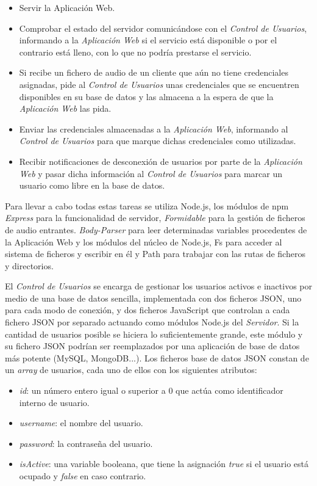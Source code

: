 \begin{itemize}
\item Servir la Aplicación Web.
\item Comprobar el estado del servidor comunicándose con el \emph{Control de Usuarios}, informando a la \emph{Aplicación Web} si el servicio está disponible o por el contrario está lleno, con lo que no podría prestarse el servicio.
\item Si recibe un fichero de audio de un cliente que aún no tiene credenciales asignadas, pide al \emph{Control de Usuarios} unas credenciales que se encuentren disponibles en su base de datos y las almacena a la espera de que la \emph{Aplicación Web} las pida.
\item Enviar las credenciales almacenadas a la \emph{Aplicación Web}, informando al \emph{Control de Usuarios} para que marque dichas credenciales como utilizadas.
\item Recibir notificaciones de desconexión de usuarios por parte de la \emph{Aplicación Web} y pasar dicha información al \emph{Control de Usuarios} para marcar un usuario como libre en la base de datos.
\end{itemize}

Para llevar a cabo todas estas tareas se utiliza Node.js, los módulos de npm \emph{Express} para la funcionalidad de servidor, \emph{Formidable} para la gestión de ficheros de audio entrantes. \emph{Body-Parser} para leer determinadas variables procedentes de la Aplicación Web y los módulos del núcleo de Node.js, Fs para acceder al sistema de ficheros y escribir en él y Path para trabajar con las rutas de ficheros y directorios.

El \emph{Control de Usuarios} se encarga de gestionar los usuarios activos e inactivos por medio de una base de datos sencilla, implementada con dos ficheros JSON, uno para cada modo de conexión, y dos ficheros JavaScript que controlan a cada fichero JSON por separado actuando como módulos Node.js del \emph{Servidor}. Si la cantidad de usuarios posible se hiciera lo suficientemente grande, este módulo y su fichero JSON podrían ser reemplazados por una aplicación de base de datos más potente (MySQL, MongoDB...). Los ficheros base de datos JSON constan de un \emph{array} de usuarios, cada uno de ellos con los siguientes atributos:

\begin{itemize}
\item \emph{id}: un número entero igual o superior a 0 que actúa como identificador interno de usuario.
\item \emph{username}: el nombre del usuario.
\item \emph{password}: la contraseña del usuario.
\item \emph{isActive}: una variable booleana, que tiene la asignación \emph{true} si el usuario está ocupado y \emph{false} en caso contrario.
\end{itemize}

